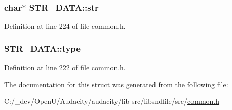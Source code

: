 \subsubsection[{\texorpdfstring{str}{str}}]{\setlength{\rightskip}{0pt plus 5cm}char$\ast$ S\+T\+R\+\_\+\+D\+A\+T\+A\+::str}\hypertarget{struct_s_t_r___d_a_t_a_a03863afa1eb7369641c60e233c56f986}{}\label{struct_s_t_r___d_a_t_a_a03863afa1eb7369641c60e233c56f986}


Definition at line 224 of file common.\+h.

\subsubsection[{\texorpdfstring{type}{type}}]{ S\+T\+R\+\_\+\+D\+A\+T\+A\+::type}\hypertarget{struct_s_t_r___d_a_t_a_aefed1fdf91377f70241c10d70853cea1}{}\label{struct_s_t_r___d_a_t_a_aefed1fdf91377f70241c10d70853cea1}


Definition at line 222 of file common.\+h.



The documentation for this struct was generated from the following file\+:\begin{DoxyCompactItemize}
\item 
C\+:/\+\_\+dev/\+Open\+U/\+Audacity/audacity/lib-\/src/libsndfile/src/\hyperlink{libsndfile_2src_2common_8h}{common.\+h}\end{DoxyCompactItemize}
